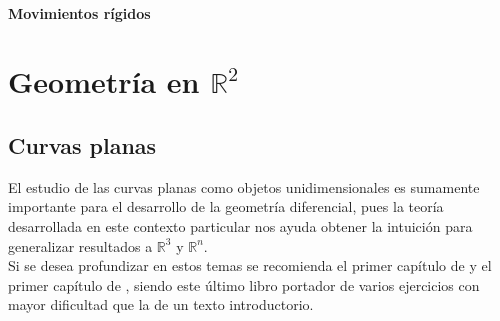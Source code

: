 \documentclass[oneside,11pt]{memoir}
\begin{document}
\subsection{Movimientos rígidos}


\part{Geometría en $\mathbb{R}^2$ }



\chapter{Curvas planas}
El estudio de las curvas planas como objetos unidimensionales es sumamente importante para el desarrollo de la geometría diferencial, pues la teoría desarrollada en este contexto particular nos ayuda obtener la intuición para generalizar  resultados a $\mathbb{R}^3$ y $\mathbb{R}^n$.\\

Si se desea profundizar en estos temas se recomienda el primer capítulo de \cite{do2016differential} y el primer capítulo de \cite{montiel2009curves}, siendo este último libro portador de varios ejercicios con mayor dificultad que la de un texto introductorio.
\end{document}
